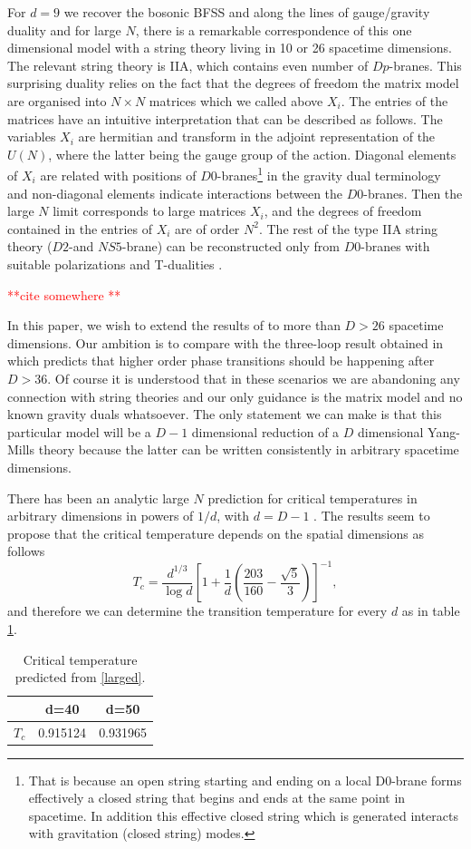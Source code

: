 \documentclass[11pt,english]{article}
\newcommand{\be}{\begin{equation}}
\newcommand{\ee}{\end{equation}}
\numberwithin{equation}{section}
\begin{document}
For $d=9$ we recover the bosonic BFSS and along the lines of gauge/gravity duality and for large $N$, there is a remarkable correspondence of this one dimensional model with a string theory living in 10 or 26 spacetime dimensions. The relevant string theory is IIA, which contains even number of $Dp$-branes.  This surprising duality relies on the fact that the degrees of freedom the matrix model are organised into $N\times N$ matrices which we called above $X_i$. The entries of the matrices have an intuitive interpretation that can be described as follows. The variables $X_i$ are hermitian and transform in the adjoint representation of the $U(N)$, where the latter being the gauge group of the action. Diagonal elements of $X_i$ are related with positions of $D0$-branes\footnote{That is because an open string starting and ending on a local D0-brane forms effectively a closed string that begins and ends at the same point in spacetime. In addition this effective closed string which is generated interacts with gravitation (closed string) modes. } in the gravity dual terminology and non-diagonal elements indicate interactions between the $D0$-branes.  Then the large $N$ limit corresponds to large matrices $X_i$, and the degrees of freedom contained in the entries of $X_i$ are of order $N^2$. The rest of the type IIA string theory ($D2$-and $NS5$-brane) can be reconstructed only from $D0$-branes with suitable polarizations and T-dualities \cite{Sen1998}.  


\textcolor{red}{**cite somewhere \cite{Gregory93}**}

In this paper, we wish to extend the results of  \cite{Bergner2019} to more than $D>26$ spacetime dimensions. Our ambition is to compare with the three-loop result obtained in  \cite{Morita2020} which predicts that higher order phase transitions should be happening after $D>36$. Of course it is understood that in these scenarios we are abandoning any connection with string theories and our only guidance is the matrix model and no known gravity duals whatsoever. The only statement we can make is that this particular model will be a $D-1$ dimensional reduction of a $D$ dimensional Yang-Mills theory because the latter can be written consistently in arbitrary spacetime dimensions.


\noindent 
There has been an analytic large $N$ prediction for critical temperatures in arbitrary dimensions in powers of $1/d$, with $d=D-1$ \cite{Mandal2010}. The results seem to propose that the critical temperature depends on the spatial dimensions as follows
\be \label{larged}
T_c=\frac{d^{1/3}}{\log d}\left[1+\frac{1}{d}\left(\frac{203}{160}-\frac{\sqrt{5}}{3}\right)\right]^{-1},
\ee  
and therefore we can determine the transition temperature for every $d$ as in table \ref{Tcrit}. 
	\begin{table}
		\centering
 \begin{tabular}{c|c|c}	
 	& d=40 &d=50\\
 \hline
 	$T_c$&0.915124&0.931965
\end{tabular}
	\caption{Critical temperature predicted from \eqref{larged}.}  
	 \label{Tcrit}
\end{table}
\end{document}

